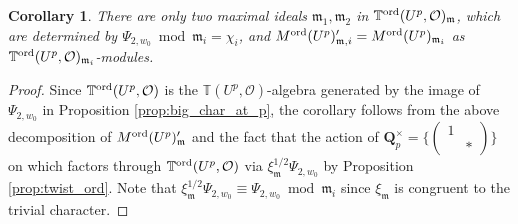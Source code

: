 \documentclass[leqno]{amsart}
\newtheorem{cor}[thm]{Corollary}
\theoremstyle{definition}
\theoremstyle{remark}
\newcommand{\smat}[1]{\left(\begin{smallmatrix} #1 \end{smallmatrix}\right)}
\newcommand{\oo}{\mathcal{O}}
\newcommand{\Qp}{\mathbf{Q}_p}
\newcommand{\fm}{\mathfrak{m}}
\newcommand{\TT}{\mathbb{T}} %
\newcommand{\ord}{\textnormal{ord}} %
\begin{document}
\begin{cor}\label{cor:two_max}
There are only two maximal ideals 
$\fm_1,\fm_2$ in $\TT^{\ord}(U^p,\oo)_{\fm}$,
which are determined by 
$\Psi_{2,w_0}\bmod \fm_i=\chi_i$,
and $M^{\ord}(U^p)_{\fm,i}'=M^{\ord}(U^p)_{\fm_i}$
as $\TT^{\ord}(U^p,\oo)_{\fm_i}$-modules.
\end{cor}
\begin{proof}
Since $\TT^{\ord}(U^p,\oo)$ is 
the $\TT(U^p,\oo)$-algebra generated by the image of $\Psi_{2,w_0}$
in Proposition \ref{prop:big_char_at_p},
the corollary follows from the above decomposition of 
$M^{\ord}(U^p)_{\fm}'$ and the fact that 
the action of $\Qp^\times=\{\smat{1&\\&*}\}$ on which 
factors through $\TT^{\ord}(U^p,\oo)$
via $\xi_{\fm}^{1/2}\Psi_{2,w_0}$ by 
Proposition \ref{prop:twist_ord}.
Note that $\xi_{\fm}^{1/2}\Psi_{2,w_0}\equiv\Psi_{2,w_0}\bmod\fm_i$
since $\xi_{\fm}$ is congruent to the trivial character.
\end{proof}
\end{document}
